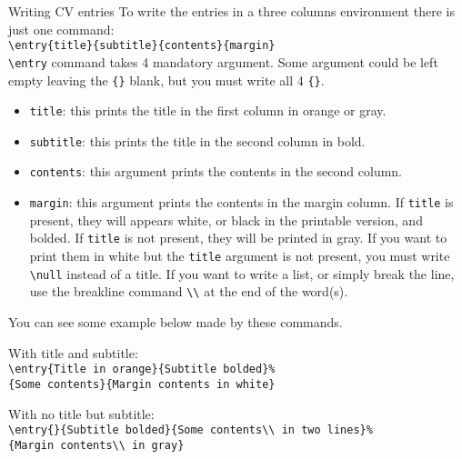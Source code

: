 \documentclass[english]{michael-cv}
\begin{document}
\newpage
\begin{para}{Writing CV entries}
To write the entries in a three columns environment there is just one command:\\
\null\hspace{4ex}\verb+\entry{title}{subtitle}{contents}{margin}+\\[1ex]
\verb+\entry+ command takes 4 mandatory argument. Some argument could be left empty leaving the \verb+{}+ blank, but you must write all 4 \verb+{}+.
\begin{itemize}
\item \texttt{title}: this prints the title in the first column in orange or gray.
\item \texttt{subtitle}: this prints the title in the second column in bold.
\item \texttt{contents}: this argument prints the contents in the second column.
\item \texttt{margin}: this argument prints the contents in the margin column. If \texttt{title} is present, they will appears white, or black in the printable version, and bolded. If \texttt{title} is not present, they will be printed in gray. If you want to print them in white but the \texttt{title} argument is not present, you must write \verb+\null+ instead of a title. If you want to write a list, or simply break the line, use the breakline command \verb+\\+ at the end of the word(s).
\end{itemize}
You can see some example below made by these commands.
\end{para}
\vfill
\begin{para}{}
With title and subtitle:\\
\verb+\entry{Title in orange}{Subtitle bolded}%+\\\verb+{Some contents}{Margin contents in white}+\\
\end{para}
\vfill
\begin{para}{}
With no title but subtitle:\\
\verb+\entry{}{Subtitle bolded}{Some contents\\ in two lines}%+\\\verb+{Margin contents\\ in gray}+\\
\end{para}
\end{document}
